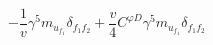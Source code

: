 %
\begin{dmath*}
%
  -  \frac{1}{v} \gamma^5 m_{u_{f_1}} \delta_{f_1 f_2}  +  \frac{v}{4} C^{ \varphi  D} \gamma^5 m_{u_{f_1}} \delta_{f_1 f_2}
%
\end{dmath*}
%
